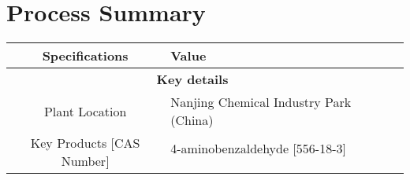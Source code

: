 \section{Process Summary}
\label{app:processsummary}

\begin{table}[H]
\begin{tabularx}{\linewidth}{l|XXX|l}
\hline
\multicolumn{2}{|c|}{\textbf{Specifications}}                              & \textbf{Value}                                                                                                                                                                                                                                                                                                                                                                                                                          \\ \hline
\multicolumn{3}{|c|}{\textbf{Key details}}                                                                                                                                                                                                                                                                                                                                                                                                                                                                           \\ \hline
\multicolumn{2}{|c|}{Plant Location}                                       & Nanjing Chemical Industry Park (China)                                                                                                                                                                                                                                                                                                                                                                                                  \\ \hline
\multicolumn{2}{|c|}{\multirow{3}{*}{Key Products {[}CAS Number{]}}}       & 4-aminobenzaldehyde {[}556-18-3{]}                                                                                                                                                                                                                                                                                                                                                                                                      \\ \cline{3-3} 

\end{tabularx}
\end{table}
